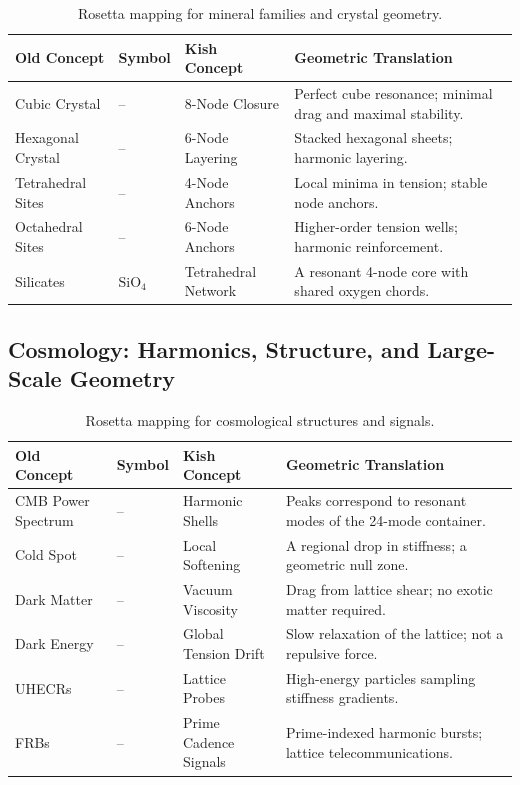 \documentclass[12pt,oneside]{book}
\begin{document}
\begin{table}[H]
\centering
\begin{tabular}{>{\raggedright}p{3cm} >{\centering}p{2cm} >{\raggedright}p{4cm} >{\raggedright\arraybackslash}p{5cm}}
\toprule
\textbf{Old Concept} & \textbf{Symbol} & \textbf{Kish Concept} & \textbf{Geometric Translation} \\
\midrule
Cubic Crystal & -- & 8-Node Closure & 
Perfect cube resonance; minimal drag and maximal stability. \\
Hexagonal Crystal & -- & 6-Node Layering & 
Stacked hexagonal sheets; harmonic layering. \\
Tetrahedral Sites & -- & 4-Node Anchors & 
Local minima in tension; stable node anchors. \\
Octahedral Sites & -- & 6-Node Anchors & 
Higher-order tension wells; harmonic reinforcement. \\
Silicates & \(\mathrm{SiO_4}\) & Tetrahedral Network & 
A resonant 4-node core with shared oxygen chords. \\
\bottomrule
\end{tabular}
\caption{Rosetta mapping for mineral families and crystal geometry.}
\end{table}

\subsection{Cosmology: Harmonics, Structure, and Large-Scale Geometry}

\begin{table}[H]
\centering
\begin{tabular}{>{\raggedright}p{3cm} >{\centering}p{2cm} >{\raggedright}p{4cm} >{\raggedright\arraybackslash}p{5cm}}
\toprule
\textbf{Old Concept} & \textbf{Symbol} & \textbf{Kish Concept} & \textbf{Geometric Translation} \\
\midrule
CMB Power Spectrum & -- & Harmonic Shells & 
Peaks correspond to resonant modes of the 24-mode container. \\
Cold Spot & -- & Local Softening & 
A regional drop in stiffness; a geometric null zone. \\
Dark Matter & -- & Vacuum Viscosity & 
Drag from lattice shear; no exotic matter required. \\
Dark Energy & -- & Global Tension Drift & 
Slow relaxation of the lattice; not a repulsive force. \\
UHECRs & -- & Lattice Probes & 
High-energy particles sampling stiffness gradients. \\
FRBs & -- & Prime Cadence Signals & 
Prime-indexed harmonic bursts; lattice telecommunications. \\
\bottomrule
\end{tabular}
\caption{Rosetta mapping for cosmological structures and signals.}
\end{table}
\end{document}
